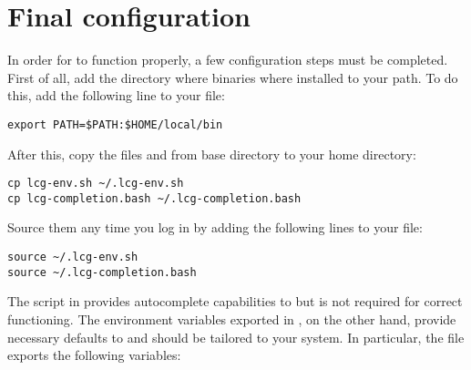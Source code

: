 \section{Final configuration}
In order for \progname to function properly, a few configuration steps
must be completed. First of all, add the directory where \progname
binaries where installed to your path. To do this, add the following
line to your  file:
\begin{lstlisting}
export PATH=$PATH:$HOME/local/bin
\end{lstlisting}
After this, copy the files  and
 from \progname base directory to your
home directory:
\begin{lstlisting}
cp lcg-env.sh ~/.lcg-env.sh
cp lcg-completion.bash ~/.lcg-completion.bash
\end{lstlisting}
Source them any time you log in by adding the following lines to your
 file:
\begin{lstlisting}
source ~/.lcg-env.sh
source ~/.lcg-completion.bash
\end{lstlisting}
The script in  provides autocomplete
capabilities to \progname but is not required for correct
functioning. The environment variables exported in
, on the other hand, provide necessary defaults
to \progname and should be tailored to your system. In particular, the
file exports the following variables:
